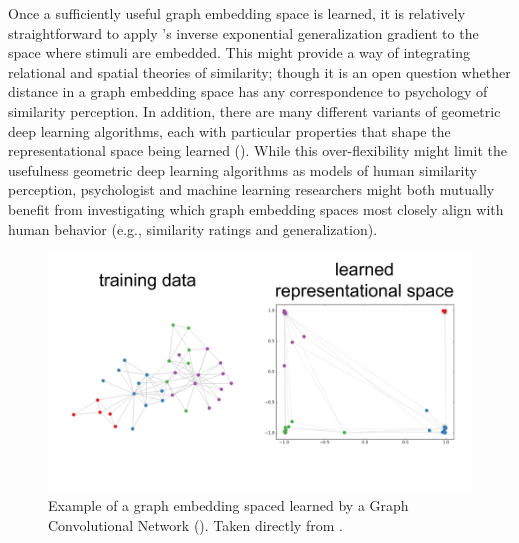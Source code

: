 \documentclass[12pt]{article}
\let\oldcite=\cite
\let\oldtextcite=\textcite
\renewcommand{\cite}[1]{\textcolor[rgb]{0, .121, .388}{\oldcite{#1}}}
\renewcommand{\textcite}[1]{\textcolor[rgb]{0, .121, .388}{\oldtextcite{#1}}}
\begin{document}
Once a sufficiently useful graph embedding space is learned, it is relatively straightforward to apply \textcite{shepard1987toward}'s inverse exponential generalization gradient to the space where stimuli are embedded. This might provide a way of integrating relational and spatial theories of similarity; though it is an open question whether distance in a graph embedding space has any correspondence to psychology of similarity perception. In addition, there are many different variants of geometric deep learning algorithms, each with particular properties that shape the representational space being learned (\cite{kipf2016semi,velivckovic2017graph,wu2020comprehensive}). While this over-flexibility might limit the usefulness geometric deep learning algorithms as models of human similarity perception, psychologist and machine learning researchers might both mutually benefit from investigating which graph embedding spaces most closely align with human behavior (e.g., similarity ratings and generalization).

\begin{figure}[h]
    \centering
    \label{fig:kipf2016semi}
    \includegraphics[scale=.4]{figures/kipf2016semi.png}
    \caption{Example of a graph embedding spaced learned by a Graph Convolutional Network (\cite{kipf2016semi}). Taken directly from \textcite{kipf2016semi}.}
\end{figure}
\end{document}
